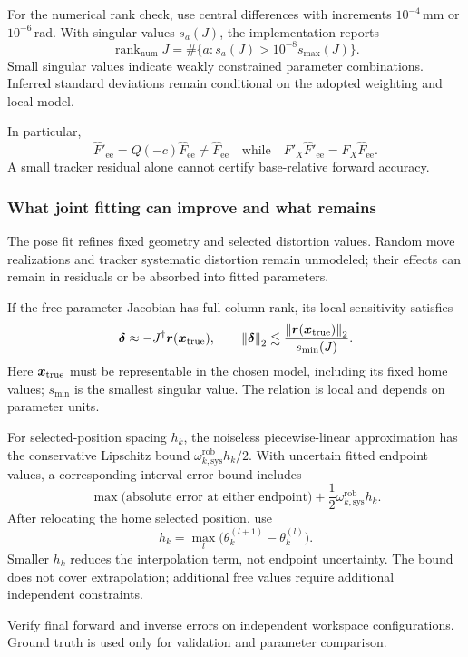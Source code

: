 \documentclass[../main.tex]{subfiles}
\begin{document}
For the numerical rank check, use central differences with increments $10^{-4}$\,mm or $10^{-6}$\,rad. With singular values $s_a(J)$, the implementation reports
\begin{equation*}
\operatorname{rank}_{\mathrm{num}}J=\#\{a:s_a(J)>10^{-8}s_{\max}(J)\}.
\end{equation*}
Small singular values indicate weakly constrained parameter combinations. Inferred standard deviations remain conditional on the adopted weighting and local model.

In particular,
\begin{equation*}
\hat F'_{\mathrm{ee}}=Q(-c)\hat F_{\mathrm{ee}}\ne\hat F_{\mathrm{ee}}
\quad\text{while}\quad F'_X\hat F'_{\mathrm{ee}}=F_X\hat F_{\mathrm{ee}}.
\end{equation*}
A small tracker residual alone cannot certify base-relative forward accuracy.

\subsubsection{What joint fitting can improve and what remains}
The pose fit refines fixed geometry and selected distortion values. Random move realizations and tracker systematic distortion remain unmodeled; their effects can remain in residuals or be absorbed into fitted parameters.

If the free-parameter Jacobian has full column rank, its local sensitivity satisfies
\begin{equation*}
\bm{\delta}\approx-J^{\dagger}\bm{r}(\bm{x}_{\mathrm{true}}),\qquad
\left\|\bm{\delta}\right\|_2\lesssim
\frac{\left\|\bm{r}(\bm{x}_{\mathrm{true}})\right\|_2}{s_{\min}(J)}.
\end{equation*}
Here $\bm{x}_{\mathrm{true}}$ must be representable in the chosen model, including its fixed home values; $s_{\min}$ is the smallest singular value. The relation is local and depends on parameter units.

For selected-position spacing $h_k$, the noiseless piecewise-linear approximation has the conservative Lipschitz bound $\omega^{\mathrm{rob}}_{k,\mathrm{sys}}h_k/2$. With uncertain fitted endpoint values, a corresponding interval error bound includes
\begin{equation*}
\max\bigl(\text{absolute error at either endpoint}\bigr)
+\frac12\omega^{\mathrm{rob}}_{k,\mathrm{sys}}h_k.
\end{equation*}
After relocating the home selected position, use
\begin{equation*}
h_k=\max_l\bigl(\theta_k^{(l+1)}-\theta_k^{(l)}\bigr).
\end{equation*}
Smaller $h_k$ reduces the interpolation term, not endpoint uncertainty. The bound does not cover extrapolation; additional free values require additional independent constraints.

Verify final forward and inverse errors on independent workspace configurations. Ground truth is used only for validation and parameter comparison.
\end{document}
